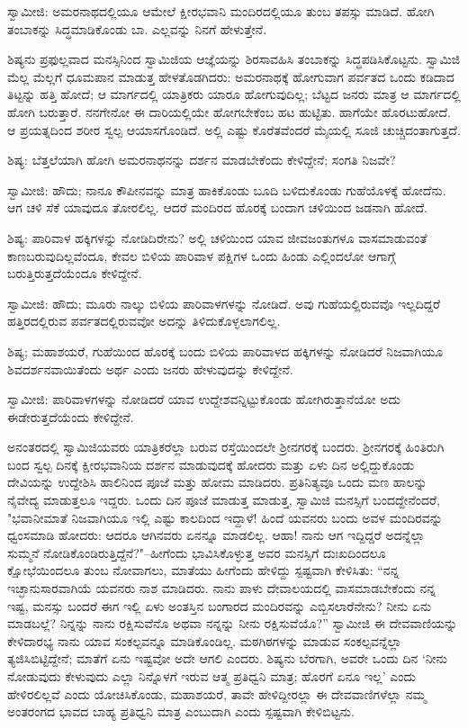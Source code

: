 ಸ್ವಾಮೀಜಿ: ಅಮರನಾಥದಲ್ಲಿಯೂ ಆಮೇಲೆ ಕ್ಷೀರಭವಾನಿ ಮಂದಿರದಲ್ಲಿಯೂ ತುಂಬ ತಪಸ್ಸು ಮಾಡಿದೆ. ಹೋಗಿ ತಂಬಾಕನ್ನು ಸಿದ್ಧಮಾಡಿಕೊಂಡು ಬಾ. ಎಲ್ಲವನ್ನು ನಿನಗೆ ಹೇಳುತ್ತೇನೆ.

ಶಿಷ್ಯನು ಪ್ರಫುಲ್ಲವಾದ ಮನಸ್ಸಿನಿಂದ ಸ್ವಾಮಿಜಿಯ ಆಜ್ಞೆಯನ್ನು ಶಿರಸಾವಹಿಸಿ ತಂಬಾಕನ್ನು ಸಿದ್ಧಪಡಿಸಿಕೊಟ್ಟನು. ಸ್ವಾಮಿಜಿ ಮೆಲ್ಲ ಮೆಲ್ಲಗೆ ಧೂಮಪಾನ ಮಾಡುತ್ತ ಹೇಳತೊಡಗಿದರು: ಅಮರನಾಥಕ್ಕೆ ಹೋಗುವಾಗ ಪರ್ವತದ ಒಂದು ಕಡಿದಾದ ತಿಟ್ಟನ್ನು ಹತ್ತಿ ಹೋದೆ; ಆ ಮಾರ್ಗದಲ್ಲಿ ಯಾತ್ರಿಕರು ಯಾರೂ ಹೋಗುವುದಿಲ್ಲ; ಬೆಟ್ಟದ ಜನರು ಮಾತ್ರ ಆ ಮಾರ್ಗದಲ್ಲಿ ಹೋಗಿ ಬರುತ್ತಾರೆ. ನನಗೇನೋ ಈ ದಾರಿಯಲ್ಲಿಯೇ ಹೋಗಬೇಕೆಂಬ ಹಟ ಹುಟ್ಟಿತು. ಹಾಗೆಯೇ ಹೊರಟುಹೋದೆ. ಆ ಪ್ರಯತ್ನದಿಂದ ಶರೀರ ಸ್ವಲ್ಪ ಆಯಾಸಗೊಂಡಿದೆ. ಅಲ್ಲಿ ಎಷ್ಟು ಕೊರೆತವೆಂದರೆ ಮೈಯಲ್ಲಿ ಸೂಜಿ ಚುಚ್ಚಿದಂತಾಗುತ್ತದೆ.

ಶಿಷ್ಯ: ಬೆತ್ತಲೆಯಾಗಿ ಹೋಗಿ ಅಮರನಾಥನನ್ನು ದರ್ಶನ ಮಾಡಬೇಕೆಂದು ಕೇಳಿದ್ದೇನೆ; ಸಂಗತಿ ನಿಜವೇ?

ಸ್ವಾಮೀಜಿ: ಹೌದು; ನಾನೂ ಕೌಪೀನವನ್ನು ಮಾತ್ರ ಹಾಕಿಕೊಂಡು ಬೂದಿ ಬಳಿದುಕೊಂಡು ಗುಹೆಯೊಳಕ್ಕೆ ಹೋದೆನು. ಆಗ ಚಳಿ ಸೆಕೆ ಯಾವುದೂ ತೋರಲಿಲ್ಲ. ಆದರೆ ಮಂದಿರದ ಹೊರಕ್ಕೆ ಬಂದಾಗ ಚಳಿಯಿಂದ ಜಡನಾಗಿ ಹೋದೆ.

ಶಿಷ್ಯ: ಪಾರಿವಾಳ ಹಕ್ಕಿಗಳನ್ನು ನೋಡಿದಿರೇನು? ಅಲ್ಲಿ ಚಳಿಯಿಂದ ಯಾವ ಜೀವಜಂತುಗಳೂ ವಾಸಮಾಡುವಂತೆ ಕಾಣಬರುವುದಿಲ್ಲವೆಂದೂ, ಕೇವಲ ಬಿಳಿಯ ಪಾರಿವಾಳ ಪಕ್ಷಿಗಳ ಒಂದು ಹಿಂಡು ಎಲ್ಲಿಂದಲೋ ಆಗಾಗ್ಗೆ ಬರುತ್ತಿರುತ್ತದೆಯೆಂದೂ ಕೇಳಿದ್ದೇನೆ.

ಸ್ವಾಮೀಜಿ: ಹೌದು; ಮೂರು ನಾಲ್ಕು ಬಿಳಿಯ ಪಾರಿವಾಳಗಳನ್ನು ನೋಡಿದೆ. ಅವು ಗುಹೆಯಲ್ಲಿರುವವೊ ಇಲ್ಲದಿದ್ದರೆ ಹತ್ತಿರದಲ್ಲಿರುವ ಪರ್ವತದಲ್ಲಿರುವವೋ ಅದನ್ನು ತಿಳಿದುಕೊಳ್ಳಲಾಗಲಿಲ್ಲ.

ಶಿಷ್ಯ; ಮಹಾಶಯರೆ, ಗುಹೆಯಿಂದ ಹೊರಕ್ಕೆ ಬಂದು ಬಿಳಿಯ ಪಾರಿವಾಳದ ಹಕ್ಕಿಗಳನ್ನು ನೋಡಿದರೆ ನಿಜವಾಗಿಯೂ ಶಿವದರ್ಶನವಾಯಿತೆಂದು ಅರ್ಥ ಎಂದು ಜನರು ಹೇಳುವುದನ್ನು ಕೇಳಿದ್ದೇನೆ.

ಸ್ವಾಮೀಜಿ: ಪಾರಿವಾಳಗಳನ್ನು ನೋಡಿದರೆ ಯಾವ ಉದ್ದೇಶವನ್ನಿಟ್ಟುಕೊಂಡು ಹೋಗಿರುತ್ತಾನೆಯೋ ಅದು ಈಡೇರುತ್ತದೆಯೆಂದು ಕೇಳಿದ್ದೇನೆ.

ಅನಂತರದಲ್ಲಿ ಸ್ವಾಮಿಜಿಯವರು ಯಾತ್ರಿಕರೆಲ್ಲಾ ಬರುವ ರಸ್ತೆಯಿಂದಲೇ ಶ‍್ರೀನಗರಕ್ಕೆ ಬಂದರು. ಶ‍್ರೀನಗರಕ್ಕೆ ಹಿಂತಿರುಗಿ ಬಂದ ಸ್ವಲ್ಪ ದಿನಕ್ಕೆ ಕ್ಷೀರಭವಾನಿಯ ದರ್ಶನ ಮಾಡುವುದಕ್ಕೆ ಹೋದರು ಮತ್ತು ಏಳು ದಿನ ಅಲ್ಲಿದ್ದುಕೊಂಡು ದೇವಿಯನ್ನು ಉದ್ದೇಶಿಸಿ ಹಾಲಿನಿಂದ ಪೂಜೆ ಮತ್ತು ಹೋಮ ಮಾಡಿದರು. ಪ್ರತಿನಿತ್ಯವೂ ಒಂದು ಮಣ ಹಾಲನ್ನು ನೈವೇದ್ಯ ಮಾಡುತ್ತಲೂ ಇದ್ದರು. ಒಂದು ದಿನ ಪೂಜೆ ಮಾಡುತ್ತ ಮಾಡುತ್ತ, ಸ್ವಾಮಿಜಿ ಮನಸ್ಸಿಗೆ ಬಂದದ್ದೇನೆಂದರೆ, "ಭವಾನೀಮಾತೆ ನಿಜವಾಗಿಯೂ ಇಲ್ಲಿ ಎಷ್ಟು ಕಾಲದಿಂದ ಇದ್ದಾಳೆ! ಹಿಂದೆ ಯವನರು ಬಂದು ಅವಳ ಮಂದಿರವನ್ನು ಧ್ವಂಸಮಾಡಿ ಹೋದರು: ಆದರೂ ಆಗಿನವರು ಏನನ್ನೂ ಮಾಡಲಿಲ್ಲ. ಆಹಾ! ನಾನು ಆಗ ಇದ್ದಿದ್ದರೆ ಅದನ್ನೆಲ್ಲಾ ಸುಮ್ಮನೆ ನೋಡಿಕೊಂಡಿರುತ್ತಿದ್ದೆನೆ?"–ಹೀಗೆಂದು ಭಾವಿಸಿಕೊಳ್ಳುತ್ತ ಅವರ ಮನಸ್ಸಿಗೆ ದುಃಖದಿಂದಲೂ ಕ್ಷೋಭೆಯಿಂದಲೂ ತುಂಬ ನೋವಾಗಲು, ಮಾತೆಯು ಹೀಗೆಂದು ಹೇಳಿದ್ದು ಸ್ಪಷ್ಟವಾಗಿ ಕೇಳಿಸಿತು: “ನನ್ನ ಇಚ್ಛಾನುಸಾರವಾಗಿಯೆ ಯವನರು ನಾಶ ಮಾಡಿದರು. ನಾನು ಪಾಳು ದೇವಾಲಯದಲ್ಲಿ ವಾಸಮಾಡಬೇಕೆಂದು ನನ್ನ ಇಷ್ಟ, ಮನಸ್ಸು ಬಂದರೆ ಈಗ ಇಲ್ಲಿ ಏಳು ಅಂತಸ್ತಿನ ಬಂಗಾರದ ಮಂದಿರವನ್ನು ಎಬ್ಬಿಸಲಾರೆನೇನು? ನೀನು ಏನು ಮಾಡಬಲ್ಲೆ? ನಿನ್ನನ್ನು ನಾನು ರಕ್ಷಿಸುವೆನೊ ಅಥವಾ ನನ್ನನ್ನು ನೀನು ರಕ್ಷಿಸುವೆಯೊ?” ಸ್ವಾಮೀಜಿ ಈ ದೇವವಾಣಿಯನ್ನು ಕೇಳಿದಾರಭ್ಯ ನಾನು ಯಾವ ಸಂಕಲ್ಪವನ್ನೂ ಮಾಡಿಕೊಂಡಿಲ್ಲ. ಮಠಗಿಠಗಳನ್ನು ಮಾಡುವ ಸಂಕಲ್ಪವನ್ನೆಲ್ಲಾ ತ್ಯಜಿಸಿಬಿಟ್ಟಿದ್ದೇನೆ; ಮಾತೆಗೆ ಏನು ಇಷ್ಟವೋ ಅದೇ ಆಗಲಿ ಎಂದರು. ಶಿಷ್ಯನು ಬೆರಗಾಗಿ, ಅವರೇ ಒಂದು ದಿನ ‘ನೀನು ನೋಡುವುದು ಕೇಳುವುದು ಎಲ್ಲಾ ನಿನ್ನೊಳಗೆ ಇರುವ ಆತ್ಮ ಪ್ರತಿಧ್ವನಿ ಮಾತ್ರ; ಹೊರಗೆ ಏನೂ ಇಲ್ಲ’ ಎಂದು ಹೇಳಿರಲಿಲ್ಲವೆ ಎಂದು ಯೋಚಿಸಿಕೊಂಡು, ಮಹಾಶಯರೆ, ತಾವೇ ಹೇಳಿದ್ದೀರಲ್ಲಾ ಈ ದೇವವಾಣಿಗಳೆಲ್ಲಾ ನಮ್ಮ ಅಂತರಂಗದ ಭಾವದ ಬಾಹ್ಯ ಪ್ರತಿಧ್ವನಿ ಮಾತ್ರ ಎಂಬುದಾಗಿ ಎಂದು ಸ್ಪಷ್ಟವಾಗಿ ಕೇಳಿಬಿಟ್ಟನು.

